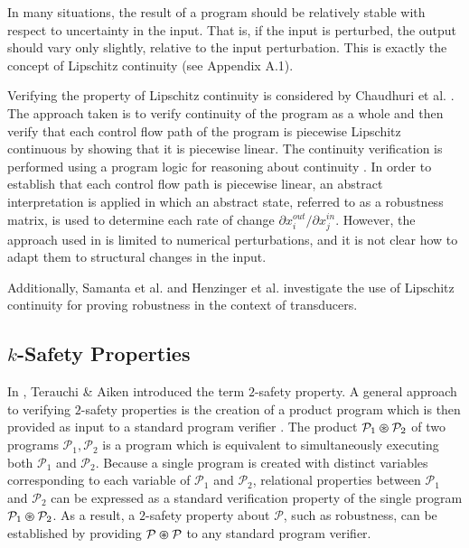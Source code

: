 \documentclass{llncs}
\begin{document}
    \space\space 
    In many situations, the result of a program should be relatively
    stable with respect to uncertainty in the input.  That is, if the input is
    perturbed, the output should vary only slightly, relative to the input
    perturbation. This is exactly the concept of Lipschitz continuity (see Appendix A.1).

    Verifying the property of Lipschitz continuity is considered by Chaudhuri et al.
    \cite{chaudhuri11}.  The approach taken is to verify continuity of
    the program as a whole and then verify that each control flow path of the
    program is piecewise Lipschitz continuous by showing that it is piecewise
    linear.  The continuity verification is performed using a program logic for
    reasoning about continuity \cite{chaudhuri10}.  In order to establish that each
    control flow path is piecewise linear, an abstract interpretation is applied in
    which an abstract state, referred to as a robustness matrix, is used to
    determine each rate of change \(\partial x_{i}^{out}/\partial x_{j}^{in}\).
    However, the approach used in
    \cite{chaudhuri10,chaudhuri11} is limited to numerical perturbations,
    and it is not clear how to adapt them to structural changes in the input.

    Additionally, Samanta et al. \cite{samanta13} and
    Henzinger et al. \cite{samanta14} investigate the use of Lipschitz continuity
    for proving robustness in the context of transducers.

  \subsection{$k$-Safety Properties}
    \space\space In \cite{terauchi05},
    Terauchi \& Aiken introduced the term \(2\)-safety property.
    A general approach to verifying \(2\)-safety properties is the creation of a
    product program which is then provided as input to a standard program verifier
    \cite{bartheproduct}.  The product \(\mathcal{P}_{1} \varoast \mathcal{P}_{2}\)
    of two programs \(\mathcal{P}_{1}, \mathcal{P}_{2}\) is a program which is
    equivalent to simultaneously executing both \(\mathcal{P}_{1}\) and
    \(\mathcal{P}_{2}\).  Because a single program is created with distinct
    variables corresponding to each variable of \(\mathcal{P}_{1}\) and
    \(\mathcal{P}_{2}\), relational properties between \(\mathcal{P}_{1}\) and
    \(\mathcal{P}_{2}\) can be expressed as a standard verification property of the
    single program \(\mathcal{P}_{1} \varoast \mathcal{P}_{2}\).  As a result, a
    \(2\)-safety property about \(\mathcal{P}\), such as robustness, can be
    established by providing \(\mathcal{P} \varoast \mathcal{P}\) to any standard
    program verifier.
\end{document}
